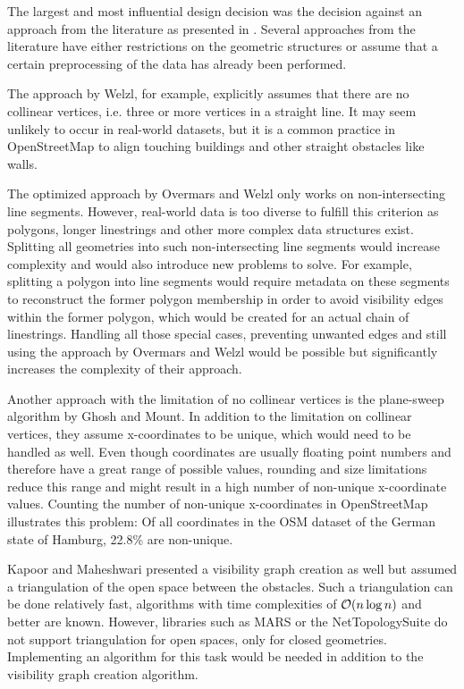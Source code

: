 		The largest and most influential design decision was the decision against an approach from the literature as presented in .
		Several approaches from the literature have either restrictions on the geometric structures or assume that a certain preprocessing of the data has already been performed.
		
		The approach by Welzl\cite{welzl-visibility-graph}, for example, explicitly assumes that there are no collinear vertices, i.e. three or more vertices in a straight line.
		It may seem unlikely to occur in real-world datasets, but it is a common practice in OpenStreetMap to align touching buildings and other straight obstacles like walls.
		
		The optimized approach by Overmars and Welzl\cite{overmars-weizl-visibility-graph} only works on non-intersecting line segments.
		However, real-world data is too diverse to fulfill this criterion as polygons, longer linestrings and other more complex data structures exist.
		Splitting all geometries into such non-intersecting line segments would increase complexity and would also introduce new problems to solve.
		For example, splitting a polygon into line segments would require metadata on these segments to reconstruct the former polygon membership in order to avoid visibility edges within the former polygon, which would be created for an actual chain of linestrings.
		Handling all those special cases, preventing unwanted edges and still using the approach by Overmars and Welzl would be possible but significantly increases the complexity of their approach.
		
		Another approach with the limitation of no collinear vertices is the plane-sweep algorithm by Ghosh and Mount\cite{ghosh-output-sensitive-vgraph}.
		In addition to the limitation on collinear vertices, they assume x-coordinates to be unique, which would need to be handled as well.
		Even though coordinates are usually floating point numbers and therefore have a great range of possible values, rounding and size limitations reduce this range and might result in a high number of non-unique x-coordinate values.
		Counting the number of non-unique x-coordinates in OpenStreetMap illustrates this problem:
		Of all coordinates in the OSM dataset of the German state of Hamburg, 22.8\% are non-unique.
		
		Kapoor and Maheshwari presented a visibility graph creation as well\cite{kapoor-shortest-path-vgraph} but assumed a triangulation of the open space between the obstacles.
		Such a triangulation can be done relatively fast, algorithms with time complexities of $\mathcal{O}(n \log{n})$ and better are known\cite[58-60]{de-berg-computational-geometry}.
		However, libraries such as MARS or the NetTopologySuite do not support triangulation for open spaces, only for closed geometries.
		Implementing an algorithm for this task would be needed in addition to the visibility graph creation algorithm.
		
